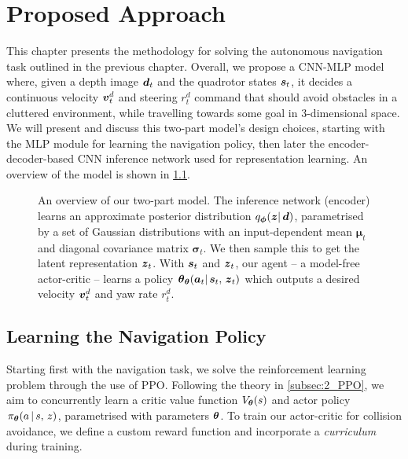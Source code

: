 \chapter{Proposed Approach}
\label{chap:5_proposed_approach}

This chapter presents the methodology for solving the autonomous navigation task outlined in the previous chapter. Overall, we propose a CNN-MLP model where, given a depth image ${\boldsymbol{d}}_t$ and the quadrotor states ${\boldsymbol{s}}_t$, it decides a continuous velocity ${\boldsymbol{v}}^d_t$ and steering $r^d_t$ command that should avoid obstacles in a cluttered environment, while travelling towards some goal in 3-dimensional space.
We will present and discuss this two-part model's design choices, starting with the MLP module for learning the navigation policy, then later the encoder-decoder-based CNN inference network used for representation learning. An overview of the model is shown in \cref{fig:5_overview}.
\begin{figure}[hbt]
    \centering
    \caption{An overview of our two-part model. The inference network (encoder) learns an approximate posterior distribution $q_{\boldsymbol{\phi}}(\boldsymbol{z} |\, {\boldsymbol{d}})$, parametrised by a set of Gaussian distributions with an input-dependent mean $\boldsymbol{\mu}_t$ and diagonal covariance matrix $\boldsymbol{\sigma}_t$. We then sample this to get the latent representation ${\boldsymbol{z}}_t$. With ${\boldsymbol{s}}_t$ and ${\boldsymbol{z}}_t$, our agent -- a model-free actor-critic -- learns a policy $\boldsymbol{\theta}_{\boldsymbol{\theta}}({\boldsymbol{a}}_t |\, {\boldsymbol{s}}_t, \, {\boldsymbol{z}}_t)$ which outputs a desired velocity ${\boldsymbol{v}}_t^d$ and yaw rate $r^d_t$.}
    \label{fig:5_overview}
\end{figure}

\section{Learning the Navigation Policy}
\label{sec:5_learning_navigation_policy}
Starting first with the navigation task, we solve the reinforcement learning problem through the use of PPO. Following the theory in \cref{subsec:2_PPO}, we aim to concurrently learn a critic value function $V_{\boldsymbol{\theta}}(s)$ and actor policy $\pi_{\boldsymbol{\theta}} (a \, | \, s, \, z)$, parametrised with parameters $\boldsymbol{\theta}$. To train our actor-critic for collision avoidance, we define a custom reward function and incorporate a \textit{curriculum} \cite{LearningWalkMassivelyParallel} during training.


